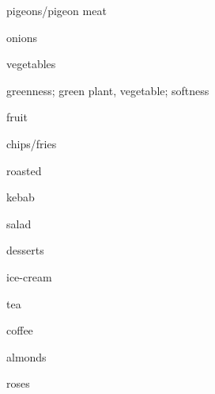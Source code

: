 \begin{flashcard}{\LARGE pigeons/pigeon meat}
\LARGE {}
\end{flashcard}
\begin{flashcard}{\LARGE onions}
\LARGE {}
\end{flashcard}
\begin{flashcard}{\LARGE vegetables}
\LARGE {}
\end{flashcard}
\begin{flashcard}{\LARGE greenness; green plant, vegetable; softness}
\LARGE {}
\end{flashcard}
\begin{flashcard}{\LARGE fruit}
\LARGE {}
\end{flashcard}
\begin{flashcard}{\LARGE chips/fries}
\LARGE {}
\end{flashcard}
\begin{flashcard}{\LARGE roasted}
\LARGE {}
\end{flashcard}
\begin{flashcard}{\LARGE kebab}
\LARGE {}
\end{flashcard}
\begin{flashcard}{\LARGE salad}
\LARGE {}
\end{flashcard}
\begin{flashcard}{\LARGE desserts}
\LARGE {}
\end{flashcard}
\begin{flashcard}{\LARGE ice-cream}
\LARGE {}
\end{flashcard}
\begin{flashcard}{\LARGE tea}
\LARGE {}
\end{flashcard}
\begin{flashcard}{\LARGE coffee}
\LARGE {}
\end{flashcard}
\begin{flashcard}{\LARGE almonds}
\LARGE {}
\end{flashcard}
\begin{flashcard}{\LARGE roses}
\LARGE {}
\end{flashcard}
